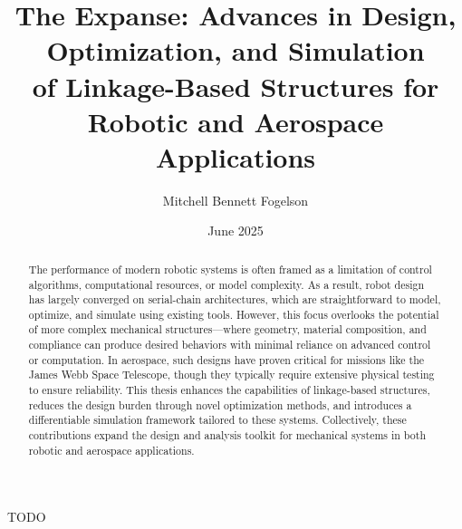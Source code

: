 \documentclass[12pt]{cmuthesis}
\begin{document}
\frontmatter

\pagestyle{empty}

\title{{\bf The Expanse: Advances in Design, Optimization, and Simulation\\ of Linkage-Based Structures for Robotic and Aerospace Applications}}
\author{Mitchell Bennett Fogelson}
\date{June 2025}


\support{}
\disclaimer{}


\maketitle

\begin{dedication}
  TODO
\end{dedication}

\begin{abstract}
The performance of modern robotic systems is often framed as a limitation of control algorithms, computational resources, or model complexity. As a result, robot design has largely converged on serial-chain architectures, which are straightforward to model, optimize, and simulate using existing tools. However, this focus overlooks the potential of more complex mechanical structures—where geometry, material composition, and compliance can produce desired behaviors with minimal reliance on advanced control or computation. In aerospace, such designs have proven critical for missions like the James Webb Space Telescope, though they typically require extensive physical testing to ensure reliability. This thesis enhances the capabilities of linkage-based structures, reduces the design burden through novel optimization methods, and introduces a differentiable simulation framework tailored to these systems. Collectively, these contributions expand the design and analysis toolkit for mechanical systems in both robotic and aerospace applications.
\end{abstract}
\end{document}
